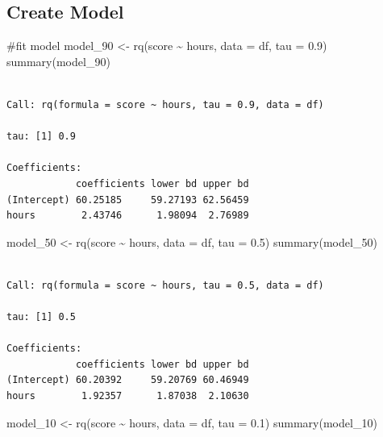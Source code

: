 \documentclass[
  letterpaper,
  DIV=11,
  numbers=noendperiod]{scrreprt}
\newenvironment{Shaded}{\begin{snugshade}}{\end{snugshade}}
\newcommand{\AttributeTok}[1]{\textcolor[rgb]{0.40,0.45,0.13}{#1}}
\newcommand{\CommentTok}[1]{\textcolor[rgb]{0.37,0.37,0.37}{#1}}
\newcommand{\FloatTok}[1]{\textcolor[rgb]{0.68,0.00,0.00}{#1}}
\newcommand{\FunctionTok}[1]{\textcolor[rgb]{0.28,0.35,0.67}{#1}}
\newcommand{\NormalTok}[1]{\textcolor[rgb]{0.00,0.23,0.31}{#1}}
\newcommand{\OtherTok}[1]{\textcolor[rgb]{0.00,0.23,0.31}{#1}}
\newcommand{\SpecialCharTok}[1]{\textcolor[rgb]{0.37,0.37,0.37}{#1}}
\begin{document}
\hypertarget{create-model}{%
\subsection{Create Model}\label{create-model}}

\begin{Shaded}
\begin{Highlighting}[]
\CommentTok{\#fit model}
\NormalTok{model\_90 }\OtherTok{\textless{}{-}} \FunctionTok{rq}\NormalTok{(score }\SpecialCharTok{\textasciitilde{}}\NormalTok{ hours, }\AttributeTok{data =}\NormalTok{ df, }\AttributeTok{tau =} \FloatTok{0.9}\NormalTok{)}
\FunctionTok{summary}\NormalTok{(model\_90)}
\end{Highlighting}
\end{Shaded}

\begin{verbatim}

Call: rq(formula = score ~ hours, tau = 0.9, data = df)

tau: [1] 0.9

Coefficients:
            coefficients lower bd upper bd
(Intercept) 60.25185     59.27193 62.56459
hours        2.43746      1.98094  2.76989
\end{verbatim}

\begin{Shaded}
\begin{Highlighting}[]
\NormalTok{model\_50 }\OtherTok{\textless{}{-}} \FunctionTok{rq}\NormalTok{(score }\SpecialCharTok{\textasciitilde{}}\NormalTok{ hours, }\AttributeTok{data =}\NormalTok{ df, }\AttributeTok{tau =} \FloatTok{0.5}\NormalTok{)}
\FunctionTok{summary}\NormalTok{(model\_50)}
\end{Highlighting}
\end{Shaded}

\begin{verbatim}

Call: rq(formula = score ~ hours, tau = 0.5, data = df)

tau: [1] 0.5

Coefficients:
            coefficients lower bd upper bd
(Intercept) 60.20392     59.20769 60.46949
hours        1.92357      1.87038  2.10630
\end{verbatim}

\begin{Shaded}
\begin{Highlighting}[]
\NormalTok{model\_10 }\OtherTok{\textless{}{-}} \FunctionTok{rq}\NormalTok{(score }\SpecialCharTok{\textasciitilde{}}\NormalTok{ hours, }\AttributeTok{data =}\NormalTok{ df, }\AttributeTok{tau =} \FloatTok{0.1}\NormalTok{)}
\FunctionTok{summary}\NormalTok{(model\_10)}
\end{Highlighting}
\end{Shaded}
\end{document}
